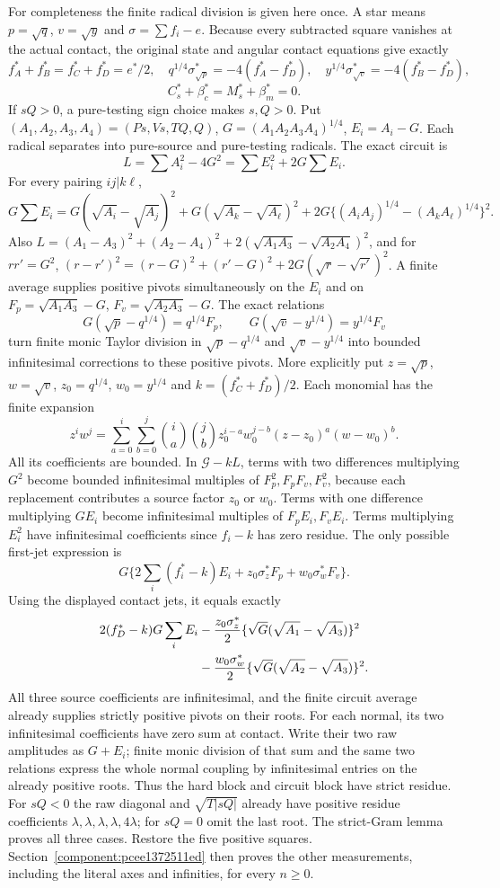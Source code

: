 For completeness the finite radical division is given here once. A
star means $p=\sqrt q$, $v=\sqrt y$ and $\sigma=\sum f_i-e$.
Because every subtracted square vanishes at the actual contact, the
original state and angular contact equations give exactly
\[
 f_A^*+f_B^*=f_C^*+f_D^*=e^*/2,
 \quad q^{1/4}\sigma_{\sqrt p}^*=-4(f_A^*-f_D^*),
 \quad y^{1/4}\sigma_{\sqrt v}^*=-4(f_B^*-f_D^*),
\]
\[
 C_s^*+\beta_c^*=M_s^*+\beta_m^*=0.
\]
If $sQ>0$, a pure-testing sign choice makes $s,Q>0$.
Put $(A_1,A_2,A_3,A_4)=(Ps,Vs,TQ,Q)$,
$G=(A_1A_2A_3A_4)^{1/4}$, $E_i=A_i-G$. Each radical separates into
pure-source and pure-testing radicals. The exact circuit is
\[
 L=\sum A_i^2-4G^2=\sum E_i^2+2G\sum E_i.
\]
For every pairing $ij|k\ell$,
\[
 G\sum E_i=G(\sqrt{A_i}-\sqrt{A_j})^2
 +G(\sqrt{A_k}-\sqrt{A_\ell})^2
 +2G\{(A_iA_j)^{1/4}-(A_kA_\ell)^{1/4}\}^2.
\]
Also $L=(A_1-A_3)^2+(A_2-A_4)^2
+2(\sqrt{A_1A_3}-\sqrt{A_2A_4})^2$, and for $rr'=G^2$,
$(r-r')^2=(r-G)^2+(r'-G)^2+2G(\sqrt r-\sqrt{r'})^2$.
A finite average supplies positive pivots simultaneously on the $E_i$
and on $F_p=\sqrt{A_1A_3}-G$, $F_v=\sqrt{A_2A_3}-G$.
The exact relations
\[
 G(\sqrt p-q^{1/4})=q^{1/4}F_p,
 \qquad G(\sqrt v-y^{1/4})=y^{1/4}F_v
\]
turn finite monic Taylor division in $\sqrt p-q^{1/4}$ and
$\sqrt v-y^{1/4}$ into bounded infinitesimal corrections to these
positive pivots. More explicitly put $z=\sqrt p$, $w=\sqrt v$,
$z_0=q^{1/4}$, $w_0=y^{1/4}$ and $k=(f_C^*+f_D^*)/2$.
Each monomial has the finite expansion
\[
 z^iw^j=\sum_{a=0}^i\sum_{b=0}^j
 {i\choose a}{j\choose b}z_0^{i-a}w_0^{j-b}
 (z-z_0)^a(w-w_0)^b.
\]
All its coefficients are bounded. In $\mathcal G-kL$, terms with two
differences multiplying $G^2$ become bounded infinitesimal multiples
of $F_p^2,F_pF_v,F_v^2$, because each replacement contributes a
source factor $z_0$ or $w_0$. Terms with one difference multiplying
$GE_i$ become infinitesimal multiples of $F_pE_i,F_vE_i$.
Terms multiplying $E_i^2$ have infinitesimal coefficients since
$f_i-k$ has zero residue. The only possible first-jet expression is
\[
 G\{2\sum_i(f_i^*-k)E_i+z_0\sigma_z^*F_p+w_0\sigma_w^*F_v\}.
\]
Using the displayed contact jets, it equals exactly
\[
 \begin{split}
 2(f_D^*-k)G\sum_iE_i
 &-{z_0\sigma_z^*\over2}
       \{\sqrt G(\sqrt{A_1}-\sqrt{A_3})\}^2\\
 &-{w_0\sigma_w^*\over2}
       \{\sqrt G(\sqrt{A_2}-\sqrt{A_3})\}^2.
 \end{split}
\]
All three source coefficients are infinitesimal, and the finite circuit
average already supplies strictly positive pivots on their roots.
For each normal, its two infinitesimal coefficients have zero sum at
contact. Write their two raw amplitudes as $G+E_i$; finite monic
division of that sum and the same two relations express the whole
normal coupling by infinitesimal entries on the already positive
roots. Thus the hard block and circuit block have strict residue.
For $sQ<0$ the raw diagonal and $\sqrt{T|sQ|}$ already have positive
residue coefficients $\lambda,\lambda,\lambda,\lambda,4\lambda$;
for $sQ=0$ omit the last root. The strict-Gram lemma proves all three
cases. Restore the five positive squares. Section~\ref{component:pcee1372511ed}
then proves the other measurements, including the literal axes and
infinities, for every $n\ge0$.


